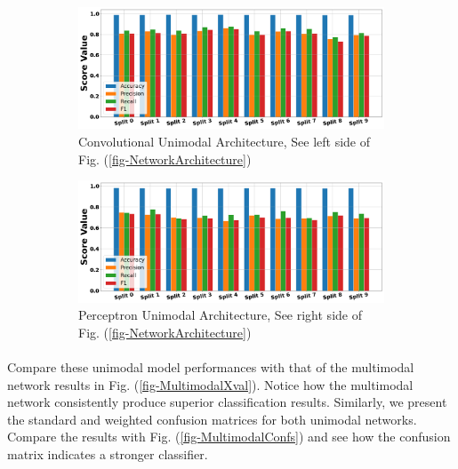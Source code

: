 \documentclass[12pt,letterpaper]{article}
\begin{document}
\begin{figure}[H]
	
	\begin{subfigure}[b]{0.9\textwidth}
	\centering
	\includegraphics[scale=0.3]{../FiguresMetrics/AvgXval-Convolution}
	\caption{Convolutional Unimodal Architecture, See left side of Fig. (\ref{fig-NetworkArchitecture})}
	\end{subfigure}	
	
	\begin{subfigure}[b]{0.9\textwidth}
	\centering
	\includegraphics[scale=0.3]{../FiguresMetrics/AvgXval-Perceptron}
	\caption{Perceptron Unimodal Architecture, See right side of Fig. (\ref{fig-NetworkArchitecture})}
	\end{subfigure}

	\caption{}
	\label{fig-UnimodalXVal}
\end{figure}

\paragraph*{}Compare these unimodal model performances with that of the multimodal network results in Fig. (\ref{fig-MultimodalXval}). Notice how the multimodal network consistently produce superior classification results. Similarly, we present the standard and weighted confusion matrices for both unimodal networks. Compare the results with Fig. (\ref{fig-MultimodalConfs}) and see how the confusion matrix indicates a stronger classifier.
\end{document}
